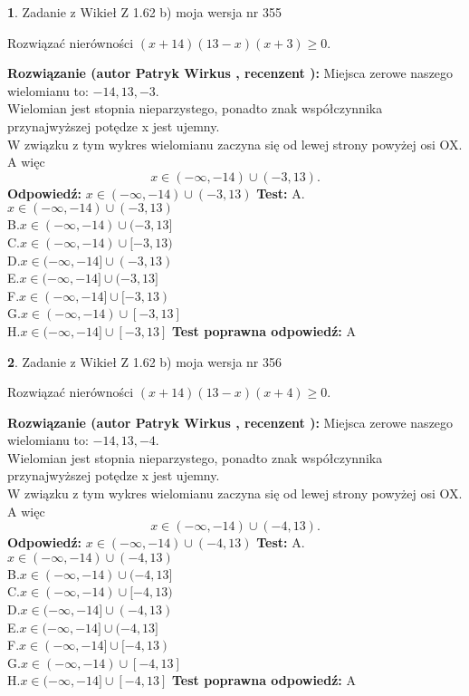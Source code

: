 \documentclass[12pt, a4paper]{article}
\theoremstyle{definition} %
\newtheorem{zad}{}
\newcommand{\zadStart}[1]{\begin{zad}#1\newline}
\newcommand{\zadStop}{\end{zad}}
\newcommand{\rozwStart}[2]{\noindent \textbf{Rozwiązanie (autor #1 , recenzent #2): }\newline}
\newcommand{\rozwStop}{\newline}
\newcommand{\odpStart}{\noindent \textbf{Odpowiedź:}\newline}
\newcommand{\odpStop}{\newline}
\newcommand{\testStart}{\noindent \textbf{Test:}\newline}
\newcommand{\testStop}{\newline}
\newcommand{\kluczStart}{\noindent \textbf{Test poprawna odpowiedź:}\newline}
\newcommand{\kluczStop}{\newline}
\begin{document}
\zadStart{Zadanie z Wikieł Z 1.62 b) moja wersja nr 355}

Rozwiązać nierówności $(x+14)(13-x)(x+3)\ge0$.
\zadStop
\rozwStart{Patryk Wirkus}{}
Miejsca zerowe naszego wielomianu to: $-14, 13, -3$.\\
Wielomian jest stopnia nieparzystego, ponadto znak współczynnika przy\linebreak najwyższej potędze x jest ujemny.\\ W związku z tym wykres wielomianu zaczyna się od lewej strony powyżej osi OX. A więc $$x \in (-\infty,-14) \cup (-3,13).$$
\rozwStop
\odpStart
$x \in (-\infty,-14) \cup (-3,13)$
\odpStop
\testStart
A.$x \in (-\infty,-14) \cup (-3,13)$\\
B.$x \in (-\infty,-14) \cup (-3,13]$\\
C.$x \in (-\infty,-14) \cup [-3,13)$\\
D.$x \in (-\infty,-14] \cup (-3,13)$\\
E.$x \in (-\infty,-14] \cup (-3,13]$\\
F.$x \in (-\infty,-14] \cup [-3,13)$\\
G.$x \in (-\infty,-14) \cup [-3,13]$\\
H.$x \in (-\infty,-14] \cup [-3,13]$
\testStop
\kluczStart
A
\kluczStop



\zadStart{Zadanie z Wikieł Z 1.62 b) moja wersja nr 356}

Rozwiązać nierówności $(x+14)(13-x)(x+4)\ge0$.
\zadStop
\rozwStart{Patryk Wirkus}{}
Miejsca zerowe naszego wielomianu to: $-14, 13, -4$.\\
Wielomian jest stopnia nieparzystego, ponadto znak współczynnika przy\linebreak najwyższej potędze x jest ujemny.\\ W związku z tym wykres wielomianu zaczyna się od lewej strony powyżej osi OX. A więc $$x \in (-\infty,-14) \cup (-4,13).$$
\rozwStop
\odpStart
$x \in (-\infty,-14) \cup (-4,13)$
\odpStop
\testStart
A.$x \in (-\infty,-14) \cup (-4,13)$\\
B.$x \in (-\infty,-14) \cup (-4,13]$\\
C.$x \in (-\infty,-14) \cup [-4,13)$\\
D.$x \in (-\infty,-14] \cup (-4,13)$\\
E.$x \in (-\infty,-14] \cup (-4,13]$\\
F.$x \in (-\infty,-14] \cup [-4,13)$\\
G.$x \in (-\infty,-14) \cup [-4,13]$\\
H.$x \in (-\infty,-14] \cup [-4,13]$
\testStop
\kluczStart
A
\kluczStop
\end{document}

